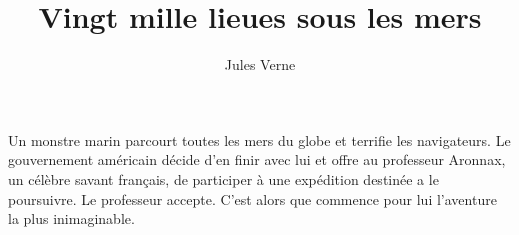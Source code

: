 \documentclass[a5paper,notitlepage]{report}
\author{Jules Verne}
\title{Vingt mille lieues sous les mers}
\begin{document}
\maketitle
Un monstre marin parcourt toutes les mers du globe et terrifie les navigateurs. Le gouvernement américain décide d'en finir
avec lui et offre au professeur Aronnax, un célèbre savant fran\c{c}ais, de participer à une expédition destinée a le poursuivre.
Le professeur accepte. C'est alors que commence pour lui l'aventure la plus inimaginable.

\end{document}

